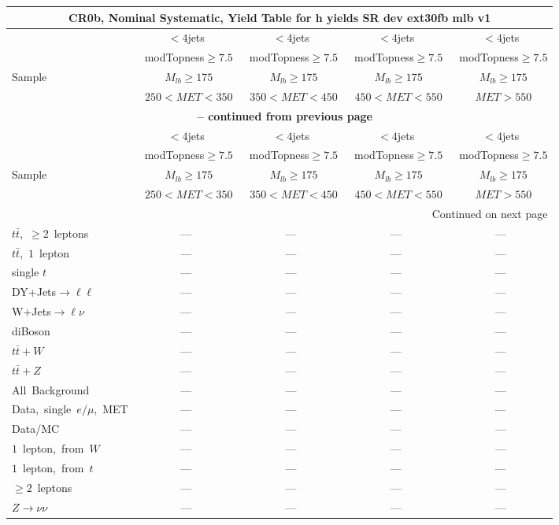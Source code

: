 \documentclass{article}
\begin{document}
\begin{longtable}{|l|c|c|c|c|} 
 
\multicolumn{5}{c}{ CR0b, Nominal Systematic, Yield Table for h yields SR dev ext30fb mlb v1 }\\* \hline 
  & $<4$jets  & $<4$jets  & $<4$jets  & $<4$jets \\* 
  & ~modTopness$\ge7.5$  & ~modTopness$\ge7.5$  & ~modTopness$\ge7.5$  & ~modTopness$\ge7.5$ \\* 
Sample  & ~$M_{lb}\ge175$  & ~$M_{lb}\ge175$  & ~$M_{lb}\ge175$  & ~$M_{lb}\ge175$ \\* 
  & ~$250<MET<350$  & ~$350<MET<450$  & ~$450<MET<550$  & ~$MET>550$ \\* 
\hline \hline 
\endfirsthead 
 
\multicolumn{5}{c}{{\bfseries \tablename\ \thetable{} -- continued from previous page}}\\* \hline 
  & $<4$jets  & $<4$jets  & $<4$jets  & $<4$jets \\* 
  & ~modTopness$\ge7.5$  & ~modTopness$\ge7.5$  & ~modTopness$\ge7.5$  & ~modTopness$\ge7.5$ \\* 
Sample  & ~$M_{lb}\ge175$  & ~$M_{lb}\ge175$  & ~$M_{lb}\ge175$  & ~$M_{lb}\ge175$ \\* 
  & ~$250<MET<350$  & ~$350<MET<450$  & ~$450<MET<550$  & ~$MET>550$ \\* 
\hline \hline 
\endhead 
 
\multicolumn{5}{|r|}{{Continued on next page}}\\* \hline 
\endfoot 
 
 
\endlastfoot 
 
$t\bar{t}$,~$\ge2$~leptons & ---  & ---  & ---  & --- \\* 
$t\bar{t}$,~$1$~lepton & ---  & ---  & ---  & --- \\* 
single $t$  & ---  & ---  & ---  & --- \\* 
DY+Jets$\rightarrow\ell\ell$  & ---  & ---  & ---  & --- \\* 
W+Jets$\rightarrow\ell\nu$  & ---  & ---  & ---  & --- \\* 
diBoson  & ---  & ---  & ---  & --- \\* 
$t\bar{t}+W$  & ---  & ---  & ---  & --- \\* 
$t\bar{t}+Z$  & ---  & ---  & ---  & --- \\* 
\hline \hline 
All~Background  & ---  & ---  & ---  & --- \\* 
Data,~single~$e/\mu$,~MET  & ---  & ---  & ---  & --- \\* 
Data/MC  & ---  & ---  & ---  & --- \\* 
\hline \hline 
$1$~lepton,~from~$W$  & ---  & ---  & ---  & --- \\* 
$1$~lepton,~from~$t$  & ---  & ---  & ---  & --- \\* 
$\ge2$~leptons  & ---  & ---  & ---  & --- \\* 
$Z\rightarrow\nu\nu$  & ---  & ---  & ---  & --- \\* 
\hline 
\end{longtable} 
\end{document}
